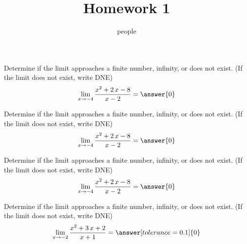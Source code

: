 \documentclass[handout]{ximera}
\title{Homework 1}
\author{people}
\begin{document}
\maketitle

\begin{shuffle}  %

\begin{problem}
  \fi
{}  \fi
{}  \fi
Determine if the limit approaches a finite number, infinity, or does not exist. (If the limit does not exist, write DNE)
\[\lim_{x\to{{-4}}}\dfrac{{{x^{2} + 2 \, x - 8}}}{{{x - 2}}}=\answer{0}\]
\end{problem}%



\begin{problem}
  \fi
{}  \fi
{}  \fi
Determine if the limit approaches a finite number, infinity, or does not exist. (If the limit does not exist, write DNE)
\[\lim_{x\to{{-4}}}\dfrac{{{x^{2} + 2 \, x - 8}}}{{{x - 2}}}=\answer{0}\]
\end{problem}%



\begin{problem}
Determine if the limit approaches a finite number, infinity, or does not exist. (If the limit does not exist, write DNE)
\[\lim_{x\to{{-4}}}\dfrac{{{x^{2} + 2 \, x - 8}}}{{{x - 2}}}=\answer{0}\]
\end{problem}%



\begin{problem}
Determine if the limit approaches a finite number, infinity, or does not exist. (If the limit does not exist, write DNE)
\[\lim_{x\to{{-2}}}\dfrac{{{x^{2} + 3 \, x + 2}}}{{{x + 1}}}=\answer[tolerance=0.1]{0}\]
\end{problem}%


\end{shuffle}
\end{document}
